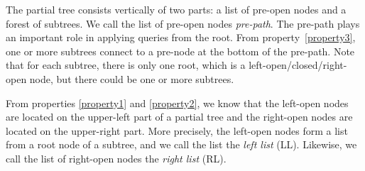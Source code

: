 The partial tree consists vertically of two parts: a list of pre-open
nodes and a forest of subtrees. We call the list of pre-open nodes
\emph{pre-path}. The pre-path plays an important role in applying queries from the root. 
From property~\ref{property3}, one or more subtrees connect to a pre-node at the bottom of
the pre-path. Note that for each subtree, there is only one root, which is
a left-open/closed/right-open node, but there could be one or more subtrees. 

From properties \ref{property1} and \ref{property2}, 
we know that the left-open nodes are located on
the upper-left part of a partial tree and the right-open nodes are located on the
upper-right part. More precisely, the left-open nodes form a list from a
root node of a subtree, and we call the list the \emph{left list} (LL). Likewise, we call the
list of right-open nodes the \emph{right list} (RL). 
